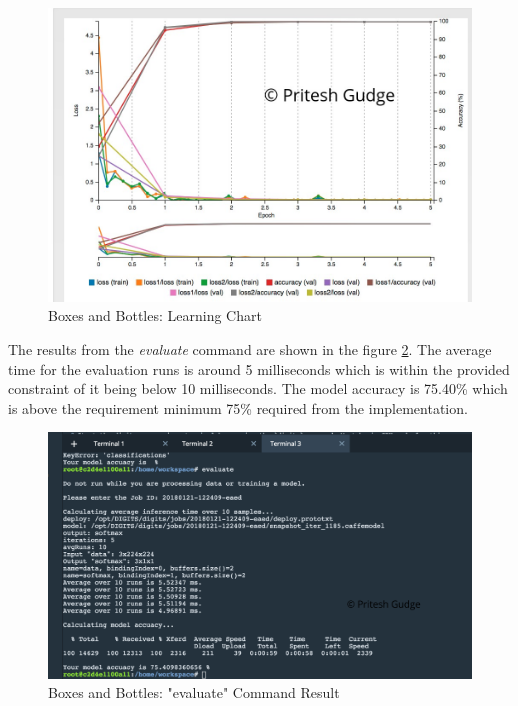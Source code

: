 \documentclass[10pt,journal,compsoc]{IEEEtran}
\begin{document}
\begin{figure}[thpb]
      \centering
      \includegraphics[width=\linewidth]{images/10_loss_accuracy}
      \caption{Boxes and Bottles: Learning Chart}
      \label{fig:boxes_learning}
\end{figure}

The results from the \emph{evaluate} command are shown in the figure \ref{fig:boxes_evaluate}. The average time for the evaluation runs is around 5 milliseconds which is within the provided constraint of it being below 10 milliseconds. The model accuracy is 75.40\% which is above the requirement minimum 75\% required from the implementation.


\begin{figure}[thpb]
      \centering
      \includegraphics[width=\linewidth]{images/9_evaluate_screenshot2_watermarked}
      \caption{Boxes and Bottles: "evaluate" Command Result}
      \label{fig:boxes_evaluate}
\end{figure}
\end{document}
